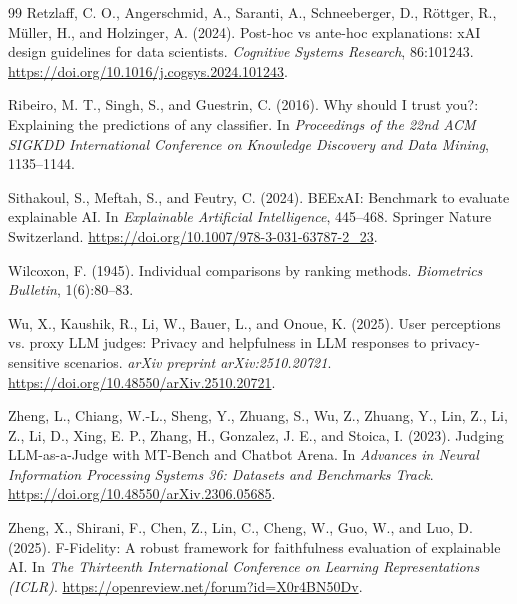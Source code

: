 \documentclass[twoside,11pt]{article}
\begin{document}
\begin{thebibliography}{99}
Retzlaff, C. O., Angerschmid, A., Saranti, A., Schneeberger, D.,
R\"{o}ttger, R., M\"{u}ller, H., and Holzinger, A. (2024).
Post-hoc vs ante-hoc explanations: xAI design guidelines for data
scientists.
\emph{Cognitive Systems Research}, 86:101243.
\url{https://doi.org/10.1016/j.cogsys.2024.101243}.

Ribeiro, M. T., Singh, S., and Guestrin, C. (2016).
Why should I trust you?: Explaining the predictions of any classifier.
In \emph{Proceedings of the 22nd ACM SIGKDD International Conference on
Knowledge Discovery and Data Mining}, 1135--1144.

Sithakoul, S., Meftah, S., and Feutry, C. (2024).
BEExAI: Benchmark to evaluate explainable AI.
In \emph{Explainable Artificial Intelligence}, 445--468.
Springer Nature Switzerland.
\url{https://doi.org/10.1007/978-3-031-63787-2_23}.

Wilcoxon, F. (1945).
Individual comparisons by ranking methods.
\emph{Biometrics Bulletin}, 1(6):80--83.

Wu, X., Kaushik, R., Li, W., Bauer, L., and Onoue, K. (2025).
User perceptions vs. proxy LLM judges: Privacy and helpfulness in LLM
responses to privacy-sensitive scenarios.
\emph{arXiv preprint arXiv:2510.20721}.
\url{https://doi.org/10.48550/arXiv.2510.20721}.

Zheng, L., Chiang, W.-L., Sheng, Y., Zhuang, S., Wu, Z., Zhuang, Y.,
Lin, Z., Li, Z., Li, D., Xing, E. P., Zhang, H., Gonzalez, J. E.,
and Stoica, I. (2023).
Judging LLM-as-a-Judge with MT-Bench and Chatbot Arena.
In \emph{Advances in Neural Information Processing Systems 36:
Datasets and Benchmarks Track}.
\url{https://doi.org/10.48550/arXiv.2306.05685}.

Zheng, X., Shirani, F., Chen, Z., Lin, C., Cheng, W., Guo, W., and Luo, D.
(2025).
F-Fidelity: A robust framework for faithfulness evaluation of explainable AI.
In \emph{The Thirteenth International Conference on Learning
Representations (ICLR)}.
\url{https://openreview.net/forum?id=X0r4BN50Dv}.


\end{thebibliography}
\end{document}
